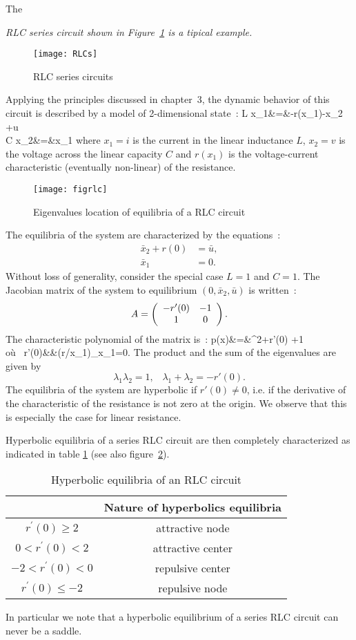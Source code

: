 The {\em RLC series circuit shown in Figure~\ref{fig:RLCs}
is a tipical example.
\begin{figure}[htbp] 
   \centering
   \texttt{[image: RLCs]} 
   \caption{RLC series circuits}
   \label{fig:RLCs}
\end{figure}
Applying the principles discussed in chapter~3, the dynamic behavior of this circuit is described by a model
of 2-dimensional state~:
\eqnn
L \dot x_1&=&-r(x_1)-x_2 +u\\
C \dot x_2&=&x_1
\eeqnn
where $x_1=i$ is the current in the linear inductance $L$, $x_2=v$ is the voltage across the linear capacity $C$ and $r(x_1)$ is the voltage-current characteristic (eventually non-linear)
of the resistance.
\begin{figure}[t] 
   \centering
   \texttt{[image: figrlc]} 
   \caption{Eigenvalues location of equilibria of a RLC circuit}
   \label{fig:figrlc}
\end{figure}

The equilibria of the system are characterized by the equations~:
\begin{align*}
\bar x_2 +r(0) &= \bar u,\\
\bar x_1 &= 0.
\end{align*}
Without loss of generality, consider the special case $L=1$ and $C=1$. 
The Jacobian matrix of the system to equilibrium $(0,\bar x_2,\bar u)$ is written~:
$$A=\bma{cc} -r'(0) & -1\\1&0\ema .$$
The characteristic polynomial of the matrix is~:
\eqnn
p(x)&=&\lambda^2+r'(0) \lambda +1\\
\mbox{o{ù} }\;\; r'(0)&\triangleq&(\partial r/\partial x_1)_{x_1=0}.
\eeqnn
The product and the sum of the eigenvalues are given by
$$ \lambda_1\lambda_2=1,  \;\;\; \lambda_1+\lambda_2=-r'(0).$$
The equilibria of the system are hyperbolic if $r'(0)\neq 0$, 
i.e. if the derivative of the characteristic of the resistance is not
zero at the origin. We observe that this is especially the case for
linear resistance.

Hyperbolic equilibria of a series RLC circuit are then completely characterized as indicated in table \ref{tabrlc} 
(see also figure~\ref{fig:figrlc}).
\begin{table}
\centering
\renewcommand{\arraystretch}{3.0}
\begin{tabular}{|c|c|}
\hline
&Nature of hyperbolics equilibria\\ \hline
$r^{'}(0) \geq 2$&attractive node \\ \hline
$0 < r^{'}(0) < 2$&attractive center \\ \hline
$-2 < r^{'}(0) < 0$&repulsive center \\ \hline
$r^{'}(0) \leq -2 $& repulsive node\\
\hline
\end{tabular}
\caption{Hyperbolic equilibria of an RLC circuit}\label{tabrlc}
\end{table}
In particular we note that a hyperbolic equilibrium of a series RLC circuit can never be a saddle.

}
